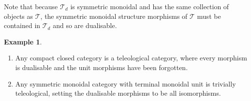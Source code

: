 \documentclass[11pt,letterpaper]{article}
\theoremstyle{plain}
\theoremstyle{definition}
\newtheorem{definition}[theorem]{Definition}
\newtheorem{example}[theorem]{Example}
\newcommand{\C}{\mathscr{C}}
\newcommand{\T}{\mathscr{T}}
\newcommand{\op}{\mathrm{op}}
\begin{document}

Note that because $\T_d$ is symmetric monoidal and has the same collection of objects as $\T$, the symmetric monoidal structure morphisms of $\T$ must be contained in $\T_d$ and so are dualisable.

\begin{example}
  ~\begin{enumerate}[(1)]
  \item Any compact closed category is a teleological category, where every morphism is dualisable and the unit morphisms have been forgotten.
  \item Any symmetric monoidal category with terminal monoidal unit is trivially teleological, setting the dualisable morphisms to be all isomorphisms.
  \end{enumerate}
\end{example}
\end{document}
